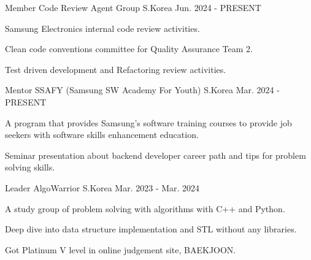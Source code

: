 

\begin{cventries}

  \cventry
    {Member} %
    {Code Review Agent Group} %
    {S.Korea} %
    {Jun. 2024 - PRESENT} %
    {
      \begin{cvitems} %
        \item {Samsung Electronics internal code review activities.}
        \item {Clean code conventions committee for Quality Assurance Team 2.}
        \item {Test driven development and Refactoring review activities.}
      \end{cvitems}
    }

  \cventry
    {Mentor} %
    {SSAFY (Samsung SW Academy For Youth)} %
    {S.Korea} %
    {Mar. 2024 - PRESENT} %
    {
      \begin{cvitems} %
        \item {A program that provides Samsung's software training courses to provide job seekers with software skills enhancement education.}
        \item {Seminar presentation about backend developer career path and tips for problem solving skills.}
      \end{cvitems}
    }

  \cventry
    {Leader} %
    {AlgoWarrior} %
    {S.Korea} %
    {Mar. 2023 - Mar. 2024} %
    {
      \begin{cvitems} %
        \item {A study group of problem solving with algorithms with C++ and Python.}
        \item {Deep dive into data structure implementation and STL without any libraries.}
        \item {Got Platinum V level in online judgement site, BAEKJOON.}
      \end{cvitems}
    }


\end{cventries}
